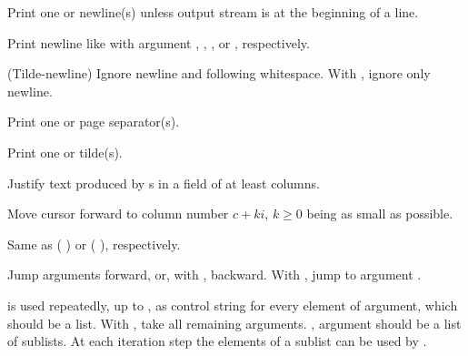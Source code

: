 \begin{LIST}{1cm}
\begin{LIST}{.5cm}
    {
    Print one or  newline(s) unless output stream is at the
    beginning of a line.
  }

    {
    Print newline like  with argument
    , , , or , respectively.
  }

    {
    (Tilde-newline) Ignore newline and following
    whitespace. With , ignore only newline.
  }

    {
    Print one or  page separator(s).
  }

    {
    Print one or  tilde(s).
  }

    {
    Justify text produced by s in a field of at least
     columns.
  }

    {
    Move cursor forward to column number $c + ki$, $k \geq 0$ being as small
    as possible.
  }

    {
    Same as (  ) or
    (  ), respectively.
  }

    {
    Jump  arguments forward, or, with \kwd{:}, backward. With
    , jump to argument .
  }

    {
     is used repeatedly, up to , as control
    string for every element of argument, which should be a list. With
    , take all remaining arguments. \kwd{:}, argument should be
    a list of sublists. At each iteration step the elements of a
    sublist can be used by . 
  }


\end{LIST}
\end{LIST}
